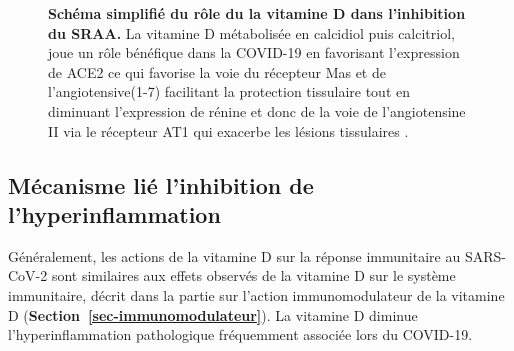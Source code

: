 \documentclass[
  a4paper,
  DIV=11,
  numbers=noendperiod,
  listof=totoc]{scrreprt}
\begin{document}
\begin{figure}


\caption[Schéma simplifié du rôle du la vitamine D dans l'inhibition du
\acl{SRAA}.]{\label{fig-vd-ras}\textbf{Schéma simplifié du rôle du la
vitamine D dans l'inhibition du \acl{SRAA}.} La vitamine D métabolisée
en calcidiol puis calcitriol, joue un rôle bénéfique dans la
\ac{COVID-19} en favorisant l'expression de \ac{ACE2} ce qui favorise la
voie du récepteur Mas et de l'angiotensive(1-7) facilitant la protection
tissulaire tout en diminuant l'expression de rénine et donc de la voie
de l'angiotensine II via le récepteur \ac{AT1} qui exacerbe les lésions
tissulaires \autocite{Borsche.2021}.}

\end{figure}%

\subsection{Mécanisme lié l'inhibition de
l'hyperinflammation}\label{muxe9canisme-liuxe9-linhibition-de-lhyperinflammation}

Généralement, les actions de la vitamine D sur la réponse immunitaire au
SARS-CoV-2 sont similaires aux effets observés de la vitamine D sur le
système immunitaire, décrit dans la partie sur l'action immunomodulateur
de la vitamine D (\textbf{Section~\ref{sec-immunomodulateur}}). La
vitamine D diminue l'hyperinflammation pathologique fréquemment associée
lors du COVID-19.
\end{document}

